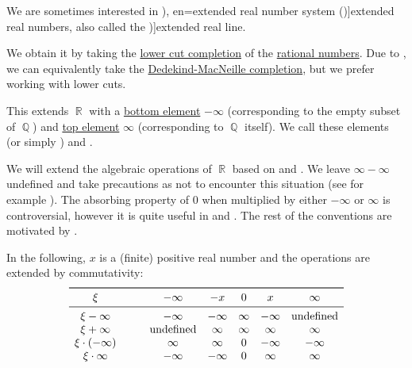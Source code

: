 \begin{definition}\label{def:extended_real_numbers}\mimprovised
  We are sometimes interested in \term[ru=расширенная вещественная прямая (\cite[23]{ИоффеТихомиров1974ЭкстремальныеЗадачи}), en=extended real number system (\cite[10]{Folland1999RealAnalysis})]{extended real numbers}, also called the \term[en=extended real line (\cite[\S 1.4]{Rudin1987RealAndComplexAnalysis})]{extended real line}.

  We obtain it by taking the \hyperref[def:lower_cut_completion]{ lower cut completion} of the \hyperref[def:rational_numbers]{rational numbers}. Due to , we can equivalently take the \hyperref[def:dedekind_macnielle_completion]{Dedekind-MacNeille completion}, but we prefer working with lower cuts.

  This extends \( \BbbR \) with a \hyperref[def:extremal_points/top_and_bottom]{bottom element} \( -\infty \) (corresponding to the empty subset of \( \BbbQ \)) and \hyperref[def:extremal_points/top_and_bottom]{top element} \( \infty \) (corresponding to \( \BbbQ \) itself). We call these elements  (or simply ) and .

  We will extend the algebraic operations of \( \BbbR \) based on \cite[\S 1.1.17]{Schechter1997AnalysisHandbook} and \cite[11]{Folland1999RealAnalysis}. We leave \( \infty - \infty \) undefined and take precautions as not to encounter this situation (see for example ). The absorbing property of \( 0 \) when multiplied by either \( -\infty \) or \( \infty \) is controversial, however it is quite useful in  and . The rest of the conventions are motivated by .

  In the following, \( x \) is a (finite) positive real number and the operations are extended by commutativity:
  \begin{equation*}
    \begin{array}{c !{\qquad} *{5}{c}}
      \toprule
      \xi                 & -\infty       & -x      & 0      & x       & \infty        \\
      \midrule
      \xi - \infty        & -\infty       & -\infty & \infty & -\infty & \T{undefined} \\
      \xi + \infty        & \T{undefined} & \infty  & \infty & \infty  & \infty \\
      \xi \cdot (-\infty) & \infty        & \infty  & 0      & -\infty & -\infty \\
      \xi \cdot \infty    & -\infty       & -\infty & 0      & \infty  & \infty \\
    \end{array}
  \end{equation*}
\end{definition}


